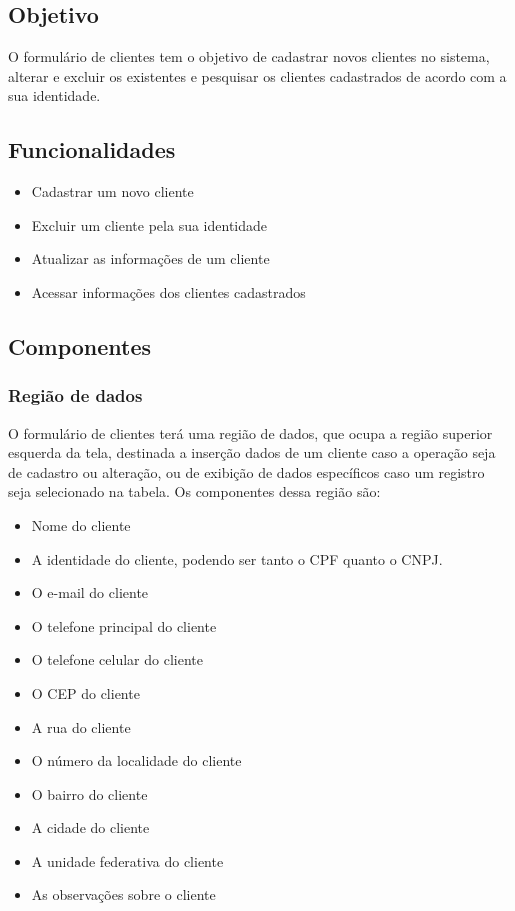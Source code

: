 \documentclass[
	article,			%
	12pt,				%
	oneside,			%
	a4paper,			%
	english,			%
	brazil,				%
	sumario=tradicional
	]{abntex2}
\begin{document}
	\subsection{Objetivo}
	O formulário de clientes tem o objetivo de cadastrar novos clientes no sistema, alterar e excluir os existentes e pesquisar os clientes cadastrados de acordo com a sua identidade.
	\subsection{Funcionalidades}
	\begin{itemize}
		\item Cadastrar um novo cliente
		\item Excluir um cliente pela sua identidade
		\item Atualizar as informações de um cliente
		\item Acessar informações dos clientes cadastrados
	\end{itemize}	
	\subsection{Componentes}
	\subsubsection{Região de dados}
	O formulário de clientes terá uma região de dados, que ocupa a região superior esquerda da tela, destinada a inserção dados de um cliente caso a operação seja de cadastro ou alteração, ou de exibição de dados específicos caso um registro seja selecionado na tabela.
	Os componentes dessa região são:
	\begin{itemize}\itemsep1.5pt
		\item Nome do cliente
		\item A identidade do cliente, podendo ser tanto o CPF quanto o CNPJ.
		\item O e-mail do cliente
		\item O telefone principal do cliente
		\item O telefone celular do cliente
		\item O CEP do cliente
		\item A rua do cliente
		\item O número da localidade do cliente
		\item O bairro do cliente
		\item A cidade do cliente
		\item A unidade federativa do cliente
		\item As observações sobre o cliente
	\end{itemize}	
\end{document}

